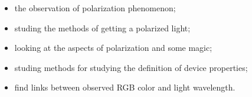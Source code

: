 \begin{itemize}
	\item the observation of polarization phenomenon;

	\phantom{239}

	\item studing the methods of getting a polarized light;

	\phantom{239}

	\item looking at the aspects of polarization and some magic;

    \phantom{239}

    \item studing methods for studying the definition of device properties;

    \phantom{239}

    \item find links between observed RGB color and light wavelength.
\end{itemize}



